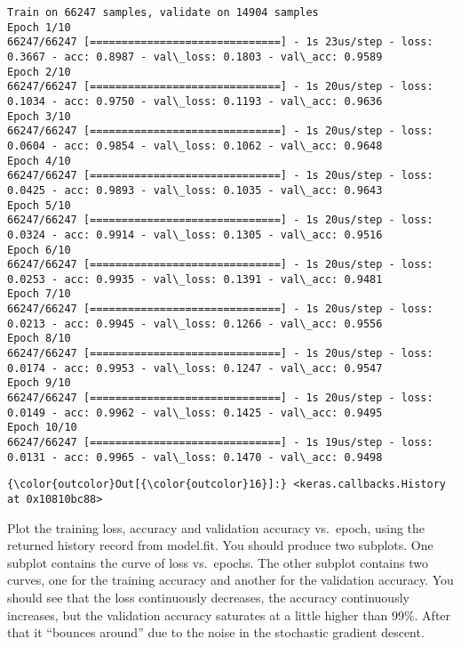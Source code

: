 \documentclass[11pt]{article}
\begin{document}
    \begin{Verbatim}[commandchars=\\\{\}]
Train on 66247 samples, validate on 14904 samples
Epoch 1/10
66247/66247 [==============================] - 1s 23us/step - loss: 0.3667 - acc: 0.8987 - val\_loss: 0.1803 - val\_acc: 0.9589
Epoch 2/10
66247/66247 [==============================] - 1s 20us/step - loss: 0.1034 - acc: 0.9750 - val\_loss: 0.1193 - val\_acc: 0.9636
Epoch 3/10
66247/66247 [==============================] - 1s 20us/step - loss: 0.0604 - acc: 0.9854 - val\_loss: 0.1062 - val\_acc: 0.9648
Epoch 4/10
66247/66247 [==============================] - 1s 20us/step - loss: 0.0425 - acc: 0.9893 - val\_loss: 0.1035 - val\_acc: 0.9643
Epoch 5/10
66247/66247 [==============================] - 1s 20us/step - loss: 0.0324 - acc: 0.9914 - val\_loss: 0.1305 - val\_acc: 0.9516
Epoch 6/10
66247/66247 [==============================] - 1s 20us/step - loss: 0.0253 - acc: 0.9935 - val\_loss: 0.1391 - val\_acc: 0.9481
Epoch 7/10
66247/66247 [==============================] - 1s 20us/step - loss: 0.0213 - acc: 0.9945 - val\_loss: 0.1266 - val\_acc: 0.9556
Epoch 8/10
66247/66247 [==============================] - 1s 20us/step - loss: 0.0174 - acc: 0.9953 - val\_loss: 0.1247 - val\_acc: 0.9547
Epoch 9/10
66247/66247 [==============================] - 1s 20us/step - loss: 0.0149 - acc: 0.9962 - val\_loss: 0.1425 - val\_acc: 0.9495
Epoch 10/10
66247/66247 [==============================] - 1s 19us/step - loss: 0.0131 - acc: 0.9965 - val\_loss: 0.1470 - val\_acc: 0.9498

    \end{Verbatim}

\begin{Verbatim}[commandchars=\\\{\}]
{\color{outcolor}Out[{\color{outcolor}16}]:} <keras.callbacks.History at 0x10810bc88>
\end{Verbatim}
            
    Plot the training loss, accuracy and validation accuracy vs.~epoch,
using the returned history record from model.fit. You should produce two
subplots. One subplot contains the curve of loss vs.~epochs. The other
subplot contains two curves, one for the training accuracy and another
for the validation accuracy. You should see that the loss continuously
decreases, the accuracy continuously increases, but the validation
accuracy saturates at a little higher than 99\%. After that it ``bounces
around'' due to the noise in the stochastic gradient descent.
\end{document}
